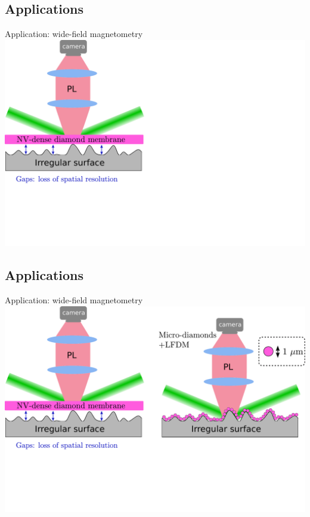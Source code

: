 \documentclass{beamer}
\begin{document}
\subsection{Applications}
\begin{frame}{Application: wide-field magnetometry}
\centering
\includegraphics[width=\textwidth,height=0.85\textheight,keepaspectratio]{Slide_applications_wide_field_f-2}
\end{frame}

\subsection{Applications}
\begin{frame}{Application: wide-field magnetometry}
\centering
\includegraphics[width=\textwidth,height=0.85\textheight,keepaspectratio]{Slide_applications_wide_field_f-1}
\end{frame}
\end{document}
